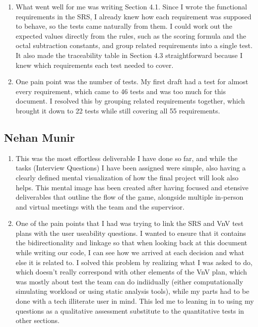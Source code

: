 \documentclass[12pt, titlepage]{article}
\begin{document}
\begin{enumerate}
  \item What went well for me was writing Section 4.1. Since I wrote the functional requirements in the SRS, I already knew how each requirement was supposed to behave, so the tests came naturally from them. I could work out the expected values directly from the rules, such as the scoring formula and the octal subtraction constants, and group related requirements into a single test. It also made the traceability table in Section 4.3 straightforward because I knew which requirements each test needed to cover.
  \item One pain point was the number of tests. My first draft had a test for almost every requirement, which came to 46 tests and was too much for this document. I resolved this by grouping related requirements together, which brought it down to 22 tests while still covering all 55 requirements.
\end{enumerate}

\subsection*{Nehan Munir}

\begin{enumerate}
  \item This was the most effortless deliverable I have done so far, and while the tasks (Interview Questions) I have been assigned were simple, also having a clearly defined mental visualization of how the final project will 
  look also helps. This mental image has been created after having focused and etensive deliverables that outline the flow of the game, alongside multiple in-person and virtual meetings with the team and the supervisor.
  \item One of the pain points that I had was trying to link the SRS and VnV test plans with the user useability questions. I wanted to ensure that it contains the bidirectionality and linkage so that when looking back at this
  document while writing our code, I can see how we arrived at each decision and what else it is related to. I solved this problem by realizing what I was asked to do, which doesn't really correspond with other elements of the
  VnV plan, which was mostly about test the team can do indiidually (either computationally simulating workload or using static analysis tools), while my parts had to be done with a tech illiterate user in mind. This led me to leaning in
  to using my questions as a qualitative assessment substitute to the quantitative tests in other sections.  
\end {enumerate}
\end{document}
